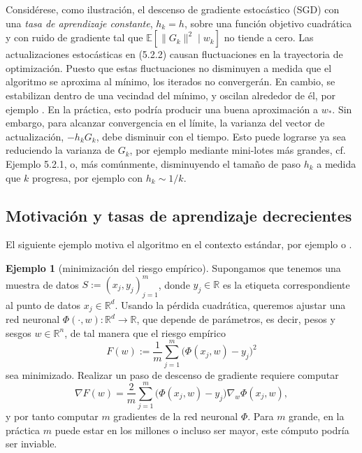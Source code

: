 \documentclass[11pt]{report}
\theoremstyle{definition}
\newtheorem{ejemplo}[definicion]{Ejemplo}
\theoremstyle{plain}
\numberwithin{equation}{section}
\begin{document}
Considérese, como ilustración, el descenso de gradiente estocástico (SGD) con una \textit{tasa de aprendizaje constante}, \(h_k=h\), sobre una función objetivo cuadrática y con ruido de gradiente tal que \(\mathbb{E}[\|G_k\|^2\mid w_k]\) no tiende a cero. Las actualizaciones estocásticas en (5.2.2) causan fluctuaciones en la trayectoria de optimización. Puesto que estas fluctuaciones no disminuyen a medida que el algoritmo se aproxima al mínimo, los iterados no convergerán. En cambio, se estabilizan dentro de una vecindad del mínimo, y oscilan alrededor de él, por ejemplo \cite[Teorema 9.8]{garrigos-gower-2024}. En la práctica, esto podría producir una buena aproximación a \(w_*\). Sin embargo, para alcanzar convergencia en el límite, la varianza del vector de actualización, \(-h_kG_k\), debe disminuir con el tiempo. Esto puede lograrse ya sea reduciendo la varianza de \(G_k\), por ejemplo mediante mini-lotes más grandes, cf. Ejemplo 5.2.1, o, más comúnmente, disminuyendo el tamaño de paso \(h_k\) a medida que \(k\) progresa, por ejemplo con \(h_k\sim 1/k\).

\subsection{Motivación y tasas de aprendizaje decrecientes}

El siguiente ejemplo motiva el algoritmo en el contexto estándar, por ejemplo \cite[Capítulo 8]{goodfellow-bengio-courville-2016} o \cite[Sección 8.4]{murphy-2022}.

\begin{ejemplo}[minimización del riesgo empírico]
Supongamos que tenemos una muestra de datos \(S:=(x_j,y_j)_{j=1}^{m}\), donde \(y_j\in\mathbb{R}\) es la etiqueta correspondiente al punto de datos \(x_j\in\mathbb{R}^d\). Usando la pérdida cuadrática, queremos ajustar una red neuronal \(\Phi(\cdot,w):\mathbb{R}^d\to\mathbb{R}\), que depende de parámetros, es decir, pesos y sesgos \(w\in\mathbb{R}^n\), de tal manera que el riesgo empírico
\begin{equation*}
    F(w)
    :=
    \frac{1}{m}
    \sum_{j=1}^{m}
    \bigl(\Phi(x_j,w)-y_j\bigr)^2
\end{equation*}
sea minimizado. Realizar un paso de descenso de gradiente requiere computar
\begin{equation*}
    \nabla F(w)
    =
    \frac{2}{m}
    \sum_{j=1}^{m}
    \bigl(\Phi(x_j,w)-y_j\bigr)
    \nabla_w\Phi(x_j,w),
    \tag{5.2.3}
\end{equation*}
y por tanto computar \(m\) gradientes de la red neuronal \(\Phi\). Para \(m\) grande, en la práctica \(m\) puede estar en los millones o incluso ser mayor, este cómputo podría ser inviable.
\end{ejemplo}
\end{document}
